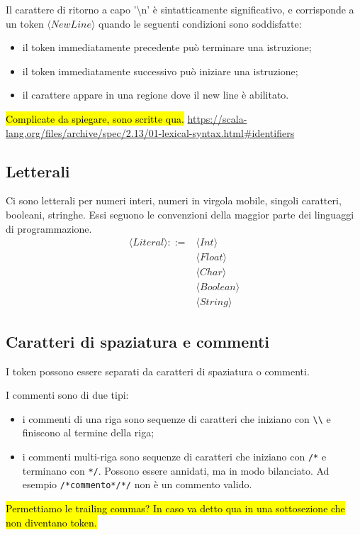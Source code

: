 \documentclass[11pt,a4paper,italian]{article}
\newcommand{\token}[1]{\langle \mathit{#1} \rangle }
\begin{document}
	Il carattere di ritorno a capo '\textbackslash n' è sintatticamente significativo, e corrisponde a un token $\token{NewLine}$ quando le seguenti condizioni sono soddisfatte:
	\begin{itemize}
		\item il token immediatamente precedente può terminare una istruzione;
		\item il token immediatamente successivo può iniziare una istruzione;
		\item il carattere appare in una regione dove il new line è abilitato.
	\end{itemize}
	\hl{Complicate da spiegare, sono scritte qua. }
	\url{https://scala-lang.org/files/archive/spec/2.13/01-lexical-syntax.html#identifiers}
	
	\subsection*{Letterali}
	Ci sono letterali per numeri interi, numeri in virgola mobile, singoli caratteri, booleani, stringhe. Essi seguono le convenzioni della maggior parte dei linguaggi di programmazione.
	\begin{align*}
	\token{Literal} ::=
	& \token{Int}\\
	& \token{Float}\\
	& \token{Char}\\
	& \token{Boolean}\\
	& \token{String}
	\end{align*}
	
	\subsection*{Caratteri di spaziatura e commenti}
	I token possono essere separati da caratteri di spaziatura o commenti.
	
	I commenti sono di due tipi:
	\begin{itemize}
		\item i commenti di una riga sono sequenze di caratteri che iniziano con \verb$\\$ e finiscono al termine della riga;
		\item i commenti multi-riga sono sequenze di caratteri che iniziano con \verb$/*$ e terminano con \verb$*/$. Possono essere annidati, ma in modo bilanciato. Ad esempio \verb$/*commento*/*/$ non è un commento valido.
	\end{itemize}
	
	\hl{Permettiamo le trailing commas? In caso va detto qua in una sottosezione che non diventano token.}
	
\end{document}
